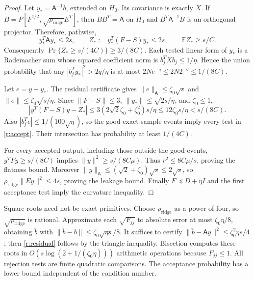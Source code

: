 \documentclass[11pt]{amsart}
\theoremstyle{definition}\newtheorem{definition}[theorem]{Definition}
\theoremstyle{remark}\newtheorem{remark}[theorem]{Remark}
\numberwithin{equation}{section}
\begin{document}
\begin{proof}
Let $y_*=\mathsf{A}^{-1}b$, extended on $H_0$. Its covariance is exactly $X$.
If $B=P[F^{1/2},\sqrt{\rho_{\mathrm{ridge}}} E^T]$, then $BB^T=\mathsf{A}$ on $H_0$ and
$B^T\mathsf{A}^{-1}B$ is an orthogonal projector. Therefore, pathwise,
\[
 y_*^T\mathsf{A}y_*\le2s,\qquad
 Z_*:=y_*^T(F-S)y_*\le2s,\qquad
 \mathbb E Z_*\ge s/C.
\]
Consequently $\Pr\{Z_*\ge s/(4C)\}\ge3/(8C)$.
Each tested linear form of $y_*$ is a Rademacher sum whose squared
coefficient norm is $b_j^TXb_j\le1/\eta$. Hence the union probability
that any $|b_j^Ty_*|^2>2q/\eta$ is at most
$2N e^{-q}\le2N2^{-q}\le1/(8C)$.

Let $e=y-y_*$. The residual certificate gives
$\|e\|_{\mathsf{A}}\le\zeta_0\sqrt s$ and
$\|e\|\le\zeta_0\sqrt{s/\eta}$.
Since $\|F-S\|\le3$, $\|y_*\|\le\sqrt{2s/\eta}$, and $\zeta_0\le1$,
\[
 |y^T(F-S)y-Z_*|
 \le 3(2\sqrt2\zeta_0+\zeta_0^2)s/\eta
 \le12\zeta_0s/\eta< s/(8C).
\]
Also $|b_j^Te|\le1/(100\sqrt\eta)$, so the good exact-sample events
imply every test in \eqref{r:accept}. Their intersection has probability
at least $1/(4C)$.

For every accepted output, including those outside the good events,
$y^TFy\ge s/(8C)$ implies $\|y\|^2\ge s/(8C\mu)$.
Thus $r^2\le8C\mu/s$, proving the flatness bound. Moreover
$\|y\|_{\mathsf{A}}\le(\sqrt2+\zeta_0)\sqrt s\le2\sqrt s$, so
$\rho_{\mathrm{ridge}}\|Ey\|^2\le4s$, proving the leakage bound.
Finally $F\preceq D+\eta I$ and the first acceptance test imply the
curvature inequality.
\end{proof}

Square roots need not be exact primitives. Choose $\rho_{\mathrm{ridge}}$ as a power of
four, so $\sqrt{\rho_{\mathrm{ridge}}}$ is rational. Approximate each $\sqrt{F_{jj}}$ to
absolute error at most $\zeta_0\eta/8$, obtaining $\widetilde b$ with
$\|\widetilde b-b\|\le\zeta_0\sqrt{\eta s}/8$.
It suffices to certify
$\|\widetilde b-\mathsf{A}y\|^2\le\zeta_0^2\eta s/4$;
then \eqref{r:residual} follows by the triangle inequality.
Bisection computes these roots in
$O(s\log(2+1/(\zeta_0\eta)))$ arithmetic operations because $F_{jj}\le1$.
All rejection tests are finite quadratic comparisons. The acceptance probability has a lower bound independent of the condition number.
\end{document}
